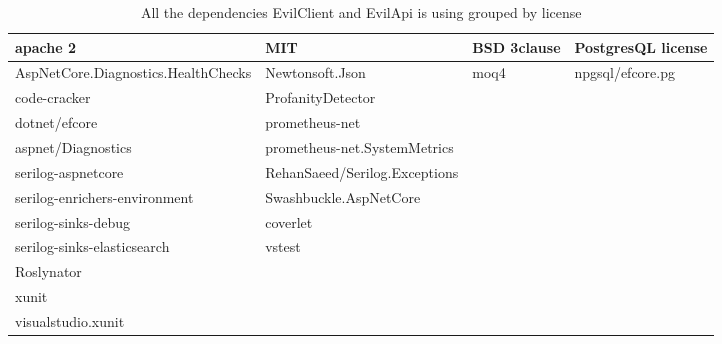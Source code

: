 \documentclass[report/main.tex]{subfiles}
\begin{document}
            \begin{table}[H]
                \small
                \begin{tabular}{|p{4.5cm}|p{4.5cm}|p{2.5cm}|p{3cm}|}
                    \hline
                    apache 2                            & MIT                           & BSD 3clause & PostgresQL license \\ \hline
                    AspNetCore.Diagnostics.\newline HealthChecks & Newtonsoft.Json               & moq4        & npgsql/efcore.pg   \\
                    code-cracker                        & ProfanityDetector             &             &                    \\
                    dotnet/efcore                       & prometheus-net                &             &                    \\
                    aspnet/Diagnostics                  & prometheus-net.SystemMetrics  &             &                    \\
                    serilog-aspnetcore                  & RehanSaeed/Serilog.\newline Exceptions &             &                    \\
                    serilog-enrichers-environment       & Swashbuckle.AspNetCore        &             &                    \\
                    serilog-sinks-debug                 & coverlet                      &             &                    \\
                    serilog-sinks-elasticsearch         & vstest                        &             &                    \\
                    Roslynator                          &                               &             &                    \\
                    xunit                               &                               &             &                    \\
                    visualstudio.xunit                  &                               &             &                    \\ \hline
                \end{tabular}
                \caption {All the dependencies EvilClient and EvilApi is using grouped by license} 
                \label{tab:title}
            \end{table}
            
\end{document}
